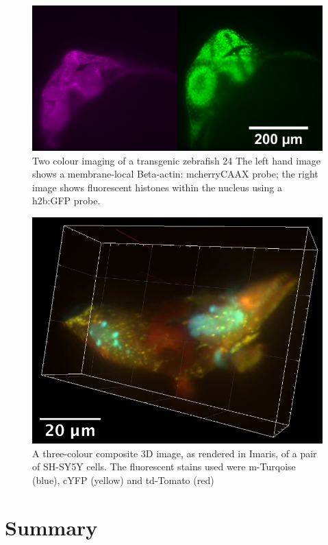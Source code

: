 \begin{figure}
    \centering
    \includegraphics[width=0.8\linewidth]{./fish_image}
    \caption[Two colour imaging of a transgenic \gls{zebrafish} 24 h.p.f.]{Two colour imaging of a transgenic \gls{zebrafish} \SI{24}{}
    The left hand image shows a membrane-local Beta-actin: mcherryCAAX probe;
    the right image shows fluorescent histones within the nucleus using a h2b:GFP probe.}\label{fig:fish_image}
\end{figure}

\begin{figure}
    \centering
    \includegraphics[width=0.8\linewidth]{./cell_image}
    \caption[A three-colour composite 3D image of a pair of \gls{SH-SY5Y} cells]{
    A three-colour composite 3D image, as rendered in Imaris, of a pair of \gls{SH-SY5Y} cells.
    The fluorescent stains used were m-Turqoise (blue), cYFP (yellow) and td-Tomato (red)}\label{fig:cell_image}
\end{figure}

\section{Summary}

